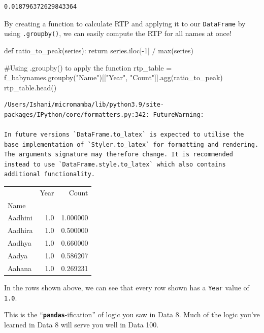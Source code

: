 \documentclass[
  letterpaper,
  DIV=11,
  numbers=noendperiod]{scrreprt}
\newenvironment{Shaded}{\begin{snugshade}}{\end{snugshade}}
\newcommand{\BuiltInTok}[1]{\textcolor[rgb]{0.00,0.23,0.31}{#1}}
\newcommand{\CommentTok}[1]{\textcolor[rgb]{0.37,0.37,0.37}{#1}}
\newcommand{\ControlFlowTok}[1]{\textcolor[rgb]{0.00,0.23,0.31}{#1}}
\newcommand{\DecValTok}[1]{\textcolor[rgb]{0.68,0.00,0.00}{#1}}
\newcommand{\KeywordTok}[1]{\textcolor[rgb]{0.00,0.23,0.31}{#1}}
\newcommand{\NormalTok}[1]{\textcolor[rgb]{0.00,0.23,0.31}{#1}}
\newcommand{\OperatorTok}[1]{\textcolor[rgb]{0.37,0.37,0.37}{#1}}
\newcommand{\StringTok}[1]{\textcolor[rgb]{0.13,0.47,0.30}{#1}}
\begin{document}
\begin{verbatim}
0.018796372629843364
\end{verbatim}

By creating a function to calculate RTP and applying it to our
\texttt{DataFrame} by using \texttt{.groupby()}, we can easily compute
the RTP for all names at once!

\begin{Shaded}
\begin{Highlighting}[]
\KeywordTok{def}\NormalTok{ ratio\_to\_peak(series):}
    \ControlFlowTok{return}\NormalTok{ series.iloc[}\OperatorTok{{-}}\DecValTok{1}\NormalTok{] }\OperatorTok{/} \BuiltInTok{max}\NormalTok{(series)}

\CommentTok{\#Using .groupby() to apply the function}
\NormalTok{rtp\_table }\OperatorTok{=}\NormalTok{ f\_babynames.groupby(}\StringTok{"Name"}\NormalTok{)[[}\StringTok{"Year"}\NormalTok{, }\StringTok{"Count"}\NormalTok{]].agg(ratio\_to\_peak)}
\NormalTok{rtp\_table.head()}
\end{Highlighting}
\end{Shaded}

\begin{verbatim}
/Users/Ishani/micromamba/lib/python3.9/site-packages/IPython/core/formatters.py:342: FutureWarning:

In future versions `DataFrame.to_latex` is expected to utilise the base implementation of `Styler.to_latex` for formatting and rendering. The arguments signature may therefore change. It is recommended instead to use `DataFrame.style.to_latex` which also contains additional functionality.
\end{verbatim}

\begin{tabular}{lrr}
\toprule
{} &  Year &     Count \\
Name    &       &           \\
\midrule
Aadhini &   1.0 &  1.000000 \\
Aadhira &   1.0 &  0.500000 \\
Aadhya  &   1.0 &  0.660000 \\
Aadya   &   1.0 &  0.586207 \\
Aahana  &   1.0 &  0.269231 \\
\bottomrule
\end{tabular}

In the rows shown above, we can see that every row shown has a
\texttt{Year} value of \texttt{1.0}.

This is the ``\textbf{\texttt{pandas}}-ification'' of logic you saw in
Data 8. Much of the logic you've learned in Data 8 will serve you well
in Data 100.
\end{document}
